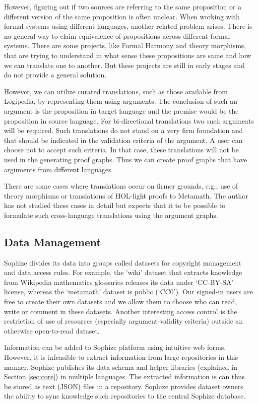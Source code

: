 \documentclass[a4paper]{article}
\begin{document}
However, figuring out if two sources are referring to the same proposition or a different version of the same proposition is often unclear. When working with formal systems using different languages, another related problem arises. There is no general way to claim equivalence of propositions across different formal systems. There are some projects, like Formal Harmony and theory morphisms, that are trying to understand in what sense these propositions are same and how we can translate one to another. But these projects are still in early stages and do not provide a general solution.

However, we can utilize curated translations, such as those available from Logipedia, by representing them using arguments. The conclusion of such an argument is the proposition in target language and the premise would be the proposition in source language. For bi-directional translations two such arguments will be required. Such translations do not stand on a very firm foundation and that should be indicated in the validation criteria of the argument. A user can choose not to accept such criteria. In that case, these translations will not be used in the generating proof graphs. Thus we can create proof graphs that have arguments from different languages.

There are some cases where translations occur on firmer grounds, e.g., use of theory morphisms or translations of HOL-light proofs to Metamath. The author has not studied these cases in detail but expects that it to be possible to formulate such cross-language translations using the argument graphs.

\subsection{Data Management}

Sophize divides its data into groups called datasets for copyright management and data access rules. For example, the 'wiki' dataset that extracts knowledge from Wikipedia mathematics glossaries releases its data under `CC-BY-SA' license, whereas the `metamath' dataset is public (`CC0'). Our signed-in users are free to create their own datasets and we allow them to choose who can read, write or comment in these datasets. Another interesting access control is the restriction of use of resources (especially argument-validity criteria) outside an otherwise open-to-read dataset.

Information can be added to Sophize platform using intuitive web forms. However, it is infeasible to extract information from large repositories in this manner. Sophize publishes its data schema and helper libraries (explained in Section \ref{sec:core}) in multiple languages. The extracted information is can thus be stored as text (JSON) files in a repository. Sophize provides dataset owners the ability to sync knowledge such repositories to the central Sophize database.
\end{document}
